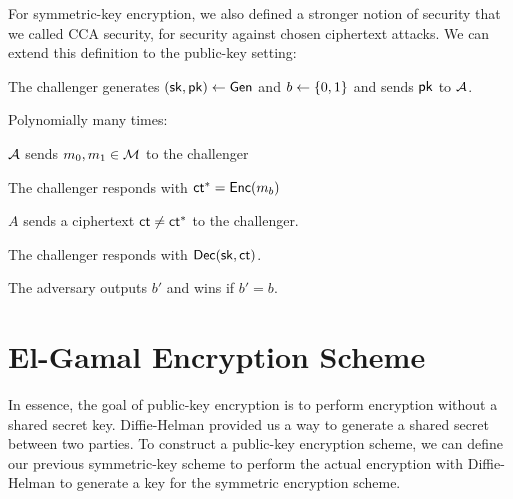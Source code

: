 For symmetric-key encryption, we also defined a stronger notion of security that we called CCA security, for security against chosen ciphertext attacks. We can extend this definition to the public-key setting:

\begin{definition}
\begin{compactitem}
	\item The challenger generates $({\mathsf{sk}}, \mathsf{pk}) \gets \mathsf{Gen}$ and $b \gets \{0,1\}$ and sends $\mathsf{pk}$ to $\mathcal{A}$.
	\item Polynomially many times:
		\begin{compactitem}
		\item $\mathcal{A}$ sends $m_0, m_1 \in \mathcal{M}$ to the challenger
		\item The challenger responds with $\mathsf{ct}^* = \mathsf{Enc}(m_b)$		
		\item $A$ sends a ciphertext $\mathsf{ct} \neq \mathsf{ct}^*$ to the challenger.
		\item The challenger responds with $\mathsf{Dec}({\mathsf{sk}}, \mathsf{ct})$.
		\end{compactitem}
	\item The adversary outputs $b'$ and wins if $b' = b$.
\end{compactitem}
\end{definition}

\section{El-Gamal Encryption Scheme}
In essence, the goal of public-key encryption is to perform encryption without a shared secret key. Diffie-Helman provided us a way to generate a shared secret between two parties. To construct a public-key encryption scheme, we can define our previous symmetric-key scheme to perform the actual encryption with Diffie-Helman to generate a key for the symmetric encryption scheme. 


